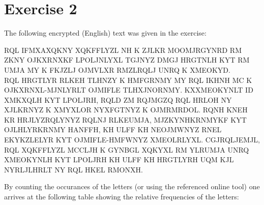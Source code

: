 \documentclass[12pt]{article}
\begin{document}
\section*{Exercise 2}
\label{sec:monoalphabetic}
The following encrypted (English) text was given in the exercise:\par

RQL IFMXAXQKNY XQKFFLYZL NH K ZJLKR MOOMJRGYNRD RM ZKNY OJKXRNXKF LPOLJNLYXL TGJNYZ DMGJ HRGTNLH KYT RM UMJA MY K FKJZLJ OJMVLXR RMZLRQLJ UNRQ K XMEOKYD.\\
RQL HRGTLYR RLKEH TLHNZY K HMFGRNMY MY RQL IKHNH MC K OJKXRNXL-MJNLYRLT OJMIFLE TLHXJNORNMY. KXXMEOKYNLT ID XMKXQLH KYT LPOLJRH, RQLD ZM RQJMGZQ RQL HRLOH NY XJLKRNYZ K XMYXLOR NYXFGTNYZ K OJMRMRDOL. RQNH KNEH KR HRJLYZRQLYNYZ RQLNJ RLKEUMJA, MJZKYNHKRNMYKF KYT OJLHLYRKRNMY HANFFH, KH ULFF KH NEOJMWNYZ RNEL EKYKZLELYR KYT OJMIFLE-HMFWNYZ XMEOLRLYXL. CGJRQLJEMJL, RQL XQKFFLYZL MCCLJH K GYNBGL XQKYXL RM YLRUMJA UNRQ XMEOKYNLH KYT LPOLJRH KH ULFF KH HRGTLYRH UQM KJL NYRLJLHRLT NY RQL HKEL RMONXH.\par

By counting the occurances of the letters (or using the referenced online tool) one arrives at the following table showing the relative frequencies of the letters:
\end{document}
